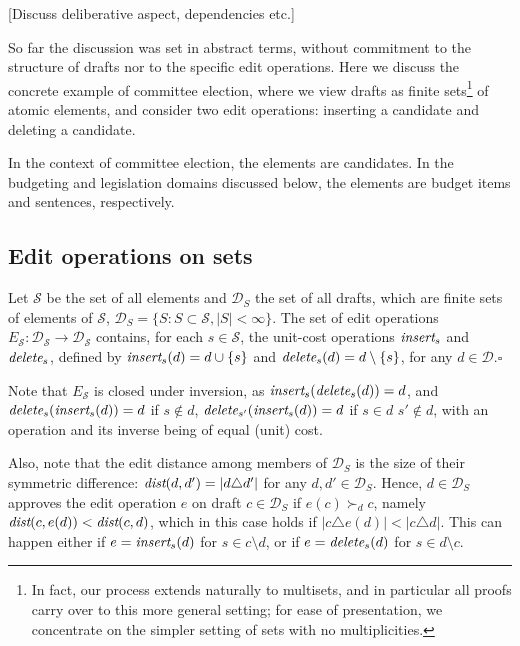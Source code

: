 \documentclass[sigconf]{aamas}  %
\newcommand{\qqed}{\hfill$\square$}
\newcommand{\calD}{\mathcal{D}}
\newcommand{\calS}{\mathcal{S}}
\newcommand{\iinsert}[1]{\emph{insert}_{#1}}
\newcommand{\ddelete}[1]{\emph{delete}_{#1}}
\newcommand{\prefers}[1]{\succ_{#1}}
\newcommand{\dist}{\emph{dist}}
\begin{document}
[Discuss deliberative aspect, dependencies etc.]




So far the discussion was set in abstract terms, without commitment to the structure of drafts nor to the specific edit operations.
Here we discuss the concrete example of committee election, where we view drafts as finite sets\footnote{In fact, our process extends naturally to multisets, and in particular all proofs carry over to this more general setting; for ease of presentation, we concentrate on the simpler setting of sets with no multiplicities.} of atomic elements, and consider two edit operations: inserting a candidate and deleting a candidate. 

In the context of committee election, the elements are candidates. In the budgeting and legislation domains discussed below, the elements are budget items and sentences, respectively.

\subsection{Edit operations on sets}

\begin{definition}
Let $\calS$ be the set of all elements and $\calD_S$ the set of all drafts, which are finite sets of elements of $\calS$,   $\calD_S = \{S: S \subset \calS, |S| < \infty\}$. The set of edit operations $E_\calS: \calD_\calS \rightarrow \calD_\calS$ contains, for each $s \in \calS$, the unit-cost operations $\iinsert{s}$ and $\ddelete{s}$, defined by
$\iinsert{s}(d) = d \cup \{s\}$ and $\ddelete{s}(d) = d \setminus \{s\}$, for any $d \in \calD$.\qqed
\end{definition}

Note that $E_\calS$ is closed under inversion, as $\iinsert{s}(\ddelete{s}(d)) = d$, and $\ddelete{s}(\iinsert{s}(d)) = d$ if $s \notin d$, $\ddelete{{s'}}(\iinsert{s}(d)) = d$ if $s \in d$ $s' \notin d$, with an operation and its inverse being of equal (unit) cost.  

Also, note that the edit distance among members of $\calD_S$ is the size of their symmetric difference:  $\dist(d,d') = |d \triangle d'|$ for any $d, d' \in \calD_S$. Hence,
$d \in \calD_S$ approves the edit operation $e$ on draft $c \in \calD_S$ if $e(c) \prefers{d} c$, namely  $\dist(c, e(d)) < \dist(c, d)$, which in this case holds if $|c \triangle e(d)| < |c \triangle d|$.  This can happen either if $e = \iinsert{s}(d)$ for $s  \in c \setminus d$, or if $e = \ddelete{s}(d)$ for $s  \in d \setminus c$. 
\end{document}
